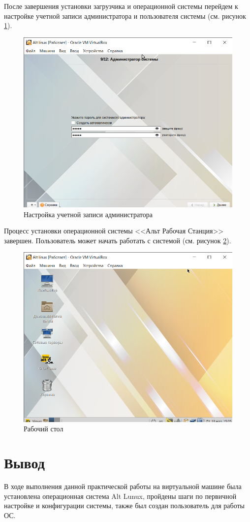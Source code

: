 \documentclass[a4paper,14pt]{extarticle}
\begin{document}
\clearpage
После завершения установки загрузчика и операционной системы перейдем к настройке учетной записи администратора и пользователя системы (см. рисунок \ref{fig:admin}).
\begin{figure}[h!]
	\centering
	\includegraphics[width=0.6\linewidth]{"images/Практика МИРЭА/Alt linux [Работает] - Oracle VM VirtualBox 18.03.2022 15_02_54"}
	\caption{Настройка учетной записи администратора}
	\label{fig:admin}
\end{figure}
Процесс установки операционной системы <<Альт Рабочая Станция>> завершен. Пользователь может начать работать с системой (см. рисунок  \ref{fig:desktop}).
\begin{figure}[h!]
	\centering
	\includegraphics[width=0.6\linewidth]{"images/Практика МИРЭА/Alt linux [Работает] - Oracle VM VirtualBox 18.03.2022 15_05_04"}
	\caption{Рабочий стол}
	\label{fig:desktop}
\end{figure}

\section*{Вывод}
В ходе выполнения данной практической работы на виртуальной машине была установлена операционная система Alt Lunux, пройдены шаги по первичной настройке и конфигурации системы, также был создан пользователь для работы ОС.
\end{document}
